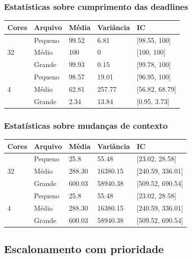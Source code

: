 \documentclass{beamer}
\begin{document}
\begin{frame}
\frametitle{Estatísticas sobre cumprimento das deadlines}
\begin{table}
\begin{tabular}{l l l l l}
\toprule
\textbf{Cores} & \textbf{Arquivo} & \textbf{Média} & \textbf{Variância} & \textbf{IC}\\
\midrule
\multirow{3}{*}{32} & Pequeno & 99.52 & 6.81   & [98.55, 100] \\
					& Médio   & 100   & 0      & [100, 100] \\
					& Grande  & 99.93 & 0.15   & [99.78, 100] \\
\midrule
\multirow{3}{*}{4}  & Pequeno & 98.57 & 19.01  & [96.95, 100] \\
					& Médio   & 62.81 & 257.77 & [56.82, 68.79] \\
					& Grande  & 2.34  & 13.84  & [0.95, 3.73] \\
\bottomrule
\end{tabular}
\end{table}
\end{frame}

\begin{frame}
\frametitle{Estatísticas sobre mudanças de contexto}
\begin{table}
\begin{tabular}{l l l l l}
\toprule
\textbf{Cores} & \textbf{Arquivo} & \textbf{Média} & \textbf{Variância} & \textbf{IC}\\
\midrule
\multirow{3}{*}{32} & Pequeno & 25.8   & 55.48    & [23.02, 28.58] \\
					& Médio   & 288.30 & 16380.15 & [240.59, 336.01] \\
					& Grande  & 600.03 & 58940.38 & [509.52, 690.54] \\
\midrule
\multirow{3}{*}{4}  & Pequeno & 25.8   & 55.48    & [23.02, 28.58] \\
					& Médio   & 288.30 & 16380.15 & [240.59, 336.01] \\
					& Grande  & 600.03 & 58940.38 & [509.52, 690.54] \\
\bottomrule
\end{tabular}
\end{table}
\end{frame}

\subsection{Escalonamento com prioridade}
\end{document}
